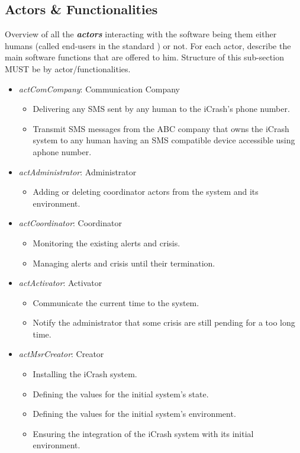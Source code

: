 \subsection{Actors \& Functionalities}
Overview of all the \textbf{\emph{\glspl{actor}}} interacting with the software
being them either humans (called end-users in the standard
\cite{IEEE-2001-userdocumentation}) or not. For each actor, describe the main
software functions that are offered to him. Structure of this sub-section MUST
be by actor/functionalities.
\begin{itemize}
\item \emph{actComCompany}: Communication Company 
	\begin{itemize}
	  \item Delivering any SMS sent by any human to the iCrash’s phone number.
	  \item Transmit SMS messages from the ABC company that owns the iCrash system
	  to any human having an SMS compatible device accessible using aphone number.
	\end{itemize}
\item \emph{actAdministrator}: Administrator
	\begin{itemize}
	  \item  Adding or deleting coordinator actors from the system and its
	  environment.
	\end{itemize}
\item \emph{actCoordinator}: Coordinator
	\begin{itemize}
	  \item Monitoring the existing alerts and crisis.
	  \item Managing alerts and crisis until their termination.
	\end{itemize}
\item \emph{actActivator}: Activator
	\begin{itemize}
	  \item Communicate the current time to the system.
	  \item Notify the administrator that some crisis are still pending for a too
	  long time.
	\end{itemize}
\item \emph{actMsrCreator}: Creator
	\begin{itemize}
	  \item Installing the iCrash system.
	  \item Defining the values for the initial system’s state.
	  \item Defining the values for the initial system’s environment.
	  \item Ensuring the integration of the iCrash system with its initial
	  environment.
	\end{itemize}
\end{itemize}



